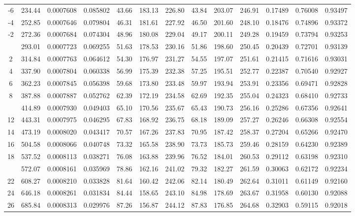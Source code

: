 \documentclass[12pt,a3paper]{article}
\begin{document}
\begin{enumerate}
\begin{center}
\begin{longtable}{c c c c c c c c c c c c c}
-6 & 234.44 & 0.0007608 & 0.085802 & 43.66 & 183.13 & 226.80 & 43.84 & 203.07 & 246.91 & 0.17489 & 0.76008 & 0.93497 \\
-4 & 252.85 & 0.0007646 & 0.079804 & 46.31 & 181.61 & 227.92 & 46.50 & 201.60 & 248.10 & 0.18476 & 0.74896 & 0.93372 \\
-2 & 272.36 & 0.0007684 & 0.074304 & 48.96 & 180.08 & 229.04 & 49.17 & 200.11 & 249.28 & 0.19459 & 0.73794 & 0.93253 \\
\addlinespace
0 & 293.01 & 0.0007723 & 0.069255 & 51.63 & 178.53 & 230.16 & 51.86 & 198.60 & 250.45 & 0.20439 & 0.72701 & 0.93139 \\
2 & 314.84 & 0.0007763 & 0.064612 & 54.30 & 176.97 & 231.27 & 54.55 & 197.07 & 251.61 & 0.21415 & 0.71616 & 0.93031 \\
4 & 337.90 & 0.0007804 & 0.060338 & 56.99 & 175.39 & 232.38 & 57.25 & 195.51 & 252.77 & 0.22387 & 0.70540 & 0.92927 \\
6 & 362.23 & 0.0007845 & 0.056398 & 59.68 & 173.80 & 233.48 & 59.97 & 193.94 & 253.91 & 0.23356 & 0.69471 & 0.92828 \\
8 & 387.88 & 0.0007887 & 0.052762 & 62.39 & 172.19 & 234.58 & 62.69 & 192.35 & 255.04 & 0.24323 & 0.68410 & 0.92733 \\
\addlinespace
10 & 414.89 & 0.0007930 & 0.049403 & 65.10 & 170.56 & 235.67 & 65.43 & 190.73 & 256.16 & 0.25286 & 0.67356 & 0.92641 \\
12 & 443.31 & 0.0007975 & 0.046295 & 67.83 & 168.92 & 236.75 & 68.18 & 189.09 & 257.27 & 0.26246 & 0.66308 & 0.92554 \\
14 & 473.19 & 0.0008020 & 0.043417 & 70.57 & 167.26 & 237.83 & 70.95 & 187.42 & 258.37 & 0.27204 & 0.65266 & 0.92470 \\
16 & 504.58 & 0.0008066 & 0.040748 & 73.32 & 165.58 & 238.90 & 73.73 & 185.73 & 259.46 & 0.28159 & 0.64230 & 0.92389 \\
18 & 537.52 & 0.0008113 & 0.038271 & 76.08 & 163.88 & 239.96 & 76.52 & 184.01 & 260.53 & 0.29112 & 0.63198 & 0.92310 \\
\addlinespace
20 & 572.07 & 0.0008161 & 0.035969 & 78.86 & 162.16 & 241.02 & 79.32 & 182.27 & 261.59 & 0.30063 & 0.62172 & 0.92234 \\
22 & 608.27 & 0.0008210 & 0.033828 & 81.64 & 160.42 & 242.06 & 82.14 & 180.49 & 262.64 & 0.31011 & 0.61149 & 0.92160 \\
24 & 646.18 & 0.0008261 & 0.031834 & 84.44 & 158.65 & 243.10 & 84.98 & 178.69 & 263.67 & 0.31958 & 0.60130 & 0.92088 \\
26 & 685.84 & 0.0008313 & 0.029976 & 87.26 & 156.87 & 244.12 & 87.83 & 176.85 & 264.68 & 0.32903 & 0.59115 & 0.92018 \\

\end{longtable}
\end{center}
\end{enumerate}
\end{document}

